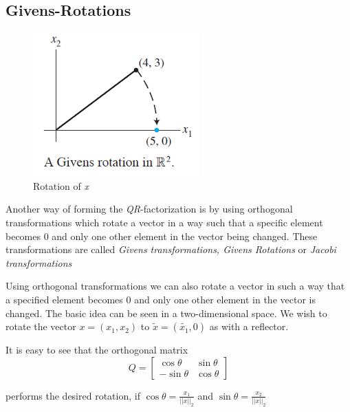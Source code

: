 \documentclass[12pt]{article}
\begin{document}
\subsection{Givens-Rotations}

\begin{figure}
\centering
\caption{Rotation of \textit{x}}
\includegraphics[scale=0.5]{../media/plots/givens.png}
\end{figure}

Another way of forming the \textit{QR}-factorization is by using orthogonal transformations which rotate a vector in a way such that a specific element becomes 0 and only one other element in the vector being changed. These transformations are called \textit{Givens transformations, Givens Rotations} or \textit{Jacobi transformations}

Using orthogonal transformations we can also rotate a vector in such a way that a specified element becomes 0 and only one other element in the vector is changed. The basic idea can be seen in a two-dimensional space. We wish to rotate the vector $x = (x_1, x_2)$ to $\tilde{x} = (\tilde{x_1}, 0)$ as with a reflector.

It is easy to see that the orthogonal matrix 
$$Q=\begin{bmatrix}
\cos\theta & \sin\theta \\
-\sin\theta & \cos\theta
\end{bmatrix}$$

performs the desired rotation, if $\cos\theta = \frac{x_1}{||x||_2}$ and $\sin\theta = \frac{x_2}{||x||_2}$
\end{document}
